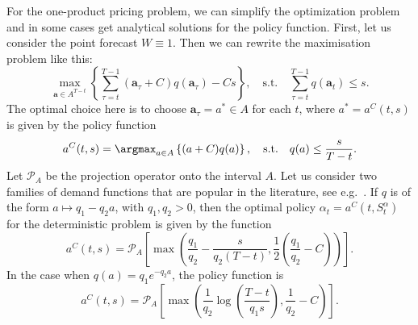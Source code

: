 \documentclass[main.tex]{subfiles}
\begin{document}
For the one-product pricing problem, we can simplify the optimization
problem and in some cases get analytical solutions for the policy function.
First, let us consider the point forecast
$W\equiv 1$.
Then we can rewrite the maximisation problem like this:
\begin{equation}
  \max_{\mathbf a\in A^{T-t}}\left\{\sum_{\tau=t}^{T-1}(\mathbf
    a_\tau+C)q(\mathbf a_\tau)-Cs\right\},
  \quad \text{s.t.}\quad \sum_{\tau=t}^{T-1}q(\mathbf a_t)\leq s.
\end{equation}
The optimal choice here is to choose $\mathbf a_\tau=a^*\in A$ for each
$t$, where $a^*=a^C(t,s)$ is given by the policy function
\begin{equation}
  a^C(t,s)=\argmax_{a\in A} \left\{(a+C)q(a)\right\},\quad\text{s.t.}\quad
  q(a)\leq \frac{s}{T-t}.
\end{equation}
Let $\mathcal P_A$ be the projection operator onto the interval $A$.
Let us consider two families of demand functions that are
popular in the literature, see e.g.~\citep[Ch.~7]{talluri2006theory}.
If $q$ is of the form $a\mapsto q_1-q_2a$, with $q_1,q_2> 0$, then
the optimal policy $\alpha_t=a^C(t,S_t^\alpha)$ for the deterministic
problem is given by the function
\begin{equation}
  a^C(t,s)=\mathcal P_A \left[ \max\left(
      \frac{q_1}{q_2}-\frac{s}{q_2(T-t)},\frac{1}{2}\left(\frac{q_1}{q_2}-C
      \right) \right) \right].
\end{equation}
In the case when $q(a)=q_1e^{-q_2a}$, the policy function is
\begin{equation}
  a^C(t,s)=\mathcal P_A\left[
    \max\left( \frac{1}{q_2}\log\left( \frac{T-t}{q_1s}\right),
      \frac{1}{q_2}-C  \right)\right].
\end{equation}
\end{document}
